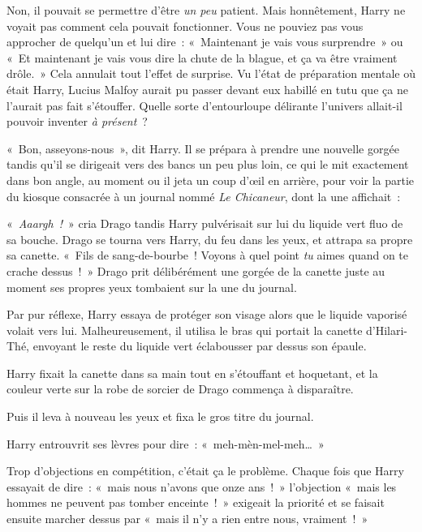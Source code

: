 Non, il pouvait se permettre d'être \emph{un peu} patient.
Mais honnêtement, Harry ne voyait pas comment cela pouvait fonctionner.
Vous ne pouviez pas vous approcher de quelqu'un et lui dire~: «~Maintenant je vais vous surprendre~» ou «~Et maintenant je vais vous dire la chute de la blague, et ça va être vraiment drôle.~»
Cela annulait tout l'effet de surprise.
Vu l'état de préparation mentale où était Harry, Lucius Malfoy aurait pu passer devant eux habillé en tutu que ça ne l'aurait pas fait s'étouffer.
Quelle sorte d'entourloupe délirante l'univers allait-il pouvoir inventer \emph{à présent}~?

«~Bon, asseyons-nous~», dit Harry.
Il se prépara à prendre une nouvelle gorgée tandis qu'il se dirigeait vers des bancs un peu plus loin, ce qui le mit exactement dans bon angle, au moment ou il jeta un coup d'œil en arrière, pour voir la partie du kiosque consacrée à un journal nommé \emph{Le Chicaneur}, dont la une affichait~:


«~\emph{Aaargh~!}~» cria Drago tandis Harry pulvérisait sur lui du liquide vert fluo de sa bouche.
Drago se tourna vers Harry, du feu dans les yeux, et attrapa sa propre sa canette.
«~Fils de sang-de-bourbe~! Voyons à quel point \emph{tu} aimes quand on te crache dessus~!~»
Drago prit délibérément une gorgée de la canette juste au moment ses propres yeux tombaient sur la une du journal.

Par pur réflexe, Harry essaya de protéger son visage alors que le liquide vaporisé volait vers lui.
Malheureusement, il utilisa le bras qui portait la canette d'Hilari-Thé, envoyant le reste du liquide vert éclabousser par dessus son épaule.

Harry fixait la canette dans sa main tout en s'étouffant et hoquetant, et la couleur verte sur la robe de sorcier de Drago commença à disparaître.

Puis il leva à nouveau les yeux et fixa le gros titre du journal.


Harry entrouvrit ses lèvres pour dire~: «~meh-mèn-mel-meh…~»

Trop d'objections en compétition, c'était ça le problème.
Chaque fois que Harry essayait de dire~: «~mais nous n'avons que onze ans~!~» l'objection «~mais les hommes ne peuvent pas tomber enceinte~!~» exigeait la priorité et se faisait ensuite marcher dessus par «~mais il n'y a rien entre nous, vraiment~!~»

